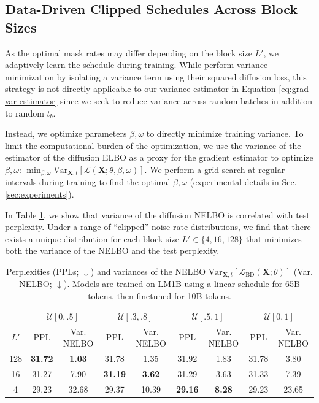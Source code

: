 \documentclass{article} %
\begin{document}
\subsection{Data-Driven Clipped Schedules Across Block Sizes}\label{sec:data-driven-schedules}
As the optimal mask rates may differ depending on the block size $L'$, we adaptively learn the schedule during training. While \cite{kingma2021variational} perform variance minimization by isolating a variance term using their squared diffusion loss, this strategy is not directly applicable to our variance estimator in Equation \ref{eq:grad-var-estimator} since we seek to reduce variance across random batches in addition to random $t_b$.

Instead, we optimize parameters $\beta, \omega$ to directly minimize training variance. To limit the computational burden of the optimization, we use the variance of the estimator of the diffusion ELBO as a proxy for the gradient estimator to optimize $\beta, \omega$: $\min_{\beta, \omega} \text{Var}_{\mathbf{X}, t} \left[ \mathcal{L}(\mathbf{X}; \theta, \beta, \omega) \right]$. We perform a grid search at regular intervals during training to find the optimal $\beta, \omega$ (experimental details in Sec. \ref{sec:experiments}).

In Table \ref{tab:lm1b_vars}, we show that variance of the diffusion NELBO is correlated with test perplexity. Under a range of ``clipped'' noise rate distributions, we find that there exists a unique distribution for each block size $L' \in \{4, 16, 128\}$ that minimizes both the variance of the NELBO and the test perplexity.



\begin{table}[ht]
    \small
  \caption{Perplexities (PPLs; $\downarrow$) and variances of the NELBO $\text{Var}_{\mathbf{X}, t}\left[ \mathcal{L}_\text{BD}(\mathbf{X}; \theta)  \right]$ (Var. NELBO; $\downarrow$). Models are trained on LM1B using a linear schedule for 65B tokens, then finetuned for 10B tokens.}
  \label{tab:lm1b_vars}
  \centering
  \setlength{\tabcolsep}{6pt} %
  \renewcommand{\arraystretch}{1.1} %
  \begin{tabular}{ccccccccc}
    \toprule
     & \multicolumn{2}{c}{$\mathcal{U}[0, .5]$} & \multicolumn{2}{c}{$\mathcal{U}[.3, .8]$} & \multicolumn{2}{c}{$\mathcal{U}[.5, 1]$} & \multicolumn{2}{c}{$\mathcal{U}[0, 1]$}  \\
    \cmidrule(lr){2-3} \cmidrule(lr){4-5} \cmidrule(lr){6-7} \cmidrule(lr){8-9}
    $L'$     & PPL & Var. NELBO & PPL & Var. NELBO & PPL & Var. NELBO & PPL & Var. NELBO \\
    \midrule
    128  & \textbf{31.72}  & \textbf{1.03} & 31.78   &  1.35  &  31.92 & 1.83 &  31.78 & 3.80  \\
    16 &  31.27 & 7.90 & \textbf{31.19} & \textbf{3.62} &  31.29  & 3.63 &     31.33 & 7.39 \\
    4   &  29.23 & 32.68 & 29.37  & 10.39 & \textbf{29.16}   & \textbf{8.28} & 29.23  &  23.65 \\
    \bottomrule
  \end{tabular}
\end{table}
\end{document}
